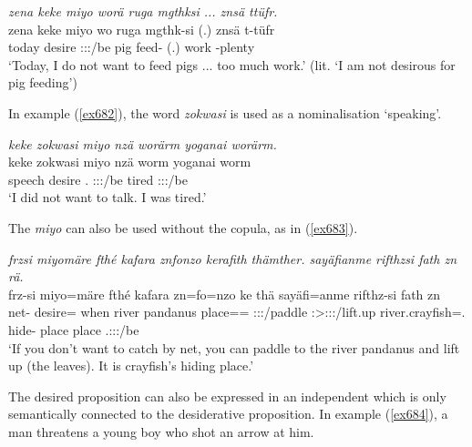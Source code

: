 \begin{exe}
	\ex \emph{zena keke miyo worä ruga mgthksi ... znsä ttüfr.}\\
	\gll zena keke miyo wo ruga mgthk-si (.) znsä t-tüfr\\
	today {\Neg} desire \Fsg:\Sbj:\Nonpast:\Ipfv/be pig feed-{\Nmlz} (.) work \Redup-plenty\\
	\trans `Today, I do not want to feed pigs ... too much work.' (lit. `I am not desirous for pig feeding')
	\label{ex681}
\end{exe}

In example (\ref{ex682}), the word \emph{zokwasi} is used as a nominalisation `speaking'.

\begin{exe}
	\ex \emph{keke zokwasi miyo nzä worärm yoganai worärm.}\\
	\gll keke zokwasi miyo nzä worm yoganai worm\\
	{\Neg} speech desire \Fsg.{\Abs} \Fsg:\Sbj:\Rpst:\Dur/be tired \Fsg:\Sbj:\Rpst:\Dur/be\\
	\trans `I did not want to talk. I was tired.'
	\label{ex682}
\end{exe}

The  \emph{miyo} can also be used without the copula, as in (\ref{ex683}).

\begin{exe}
	\ex \emph{frzsi miyomäre fthé kafara znfonzo kerafith thämther. sayäfianme rifthzsi fath zn rä.}\\
	\gll frz-si miyo=märe fthé kafara zn=fo=nzo ke thä sayäfi=anme rifthz-si fath zn \\
	net-{\Nmlz} desire={\Priv} when {river pandanus} place=\All={\Only} \Ssg:\Sbj:\Imp:\Pfv/paddle \Ssg:\Sbj>\Stpl:\Obj:\Imp:\Pfv/lift.up {river.crayfish}=\Poss.{\Nsg} hide-{\Nmlz} place place \Tsg.\F:\Sbj:\Nonpast:\Ipfv/be\\
	\trans `If you don't want to catch by net, you can paddle to the river pandanus and lift up (the leaves). It is crayfish's hiding place.'
	\label{ex683}
\end{exe}

The desired proposition can also be expressed in an independent  which is only semantically connected to the desiderative proposition. In example (\ref{ex684}), a man threatens a young boy who shot an arrow at him.

